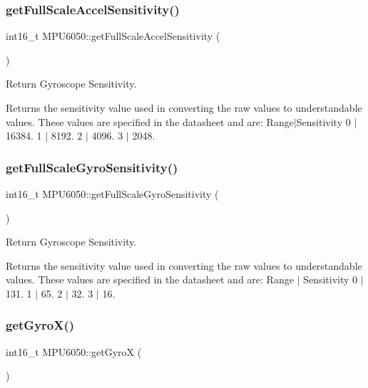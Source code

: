 \subsubsection{\texorpdfstring{get\+Full\+Scale\+Accel\+Sensitivity()}{getFullScaleAccelSensitivity()}}
{\footnotesize\ttfamily int16\+\_\+t M\+P\+U6050\+::get\+Full\+Scale\+Accel\+Sensitivity (\begin{DoxyParamCaption}{ }\end{DoxyParamCaption})}



Return Gyroscope Sensitivity. 

Returns the sensitivity value used in converting the raw values to understandable values. These values are specified in the datasheet and are\+: Range$\vert$\+Sensitivity 0 $\vert$ 16384. 1 $\vert$ 8192. 2 $\vert$ 4096. 3 $\vert$ 2048. \mbox{\label{class_m_p_u6050_af5bb476a5c5960a234ce87ff6cfbc495}} 
\subsubsection{\texorpdfstring{get\+Full\+Scale\+Gyro\+Sensitivity()}{getFullScaleGyroSensitivity()}}
{\footnotesize\ttfamily int16\+\_\+t M\+P\+U6050\+::get\+Full\+Scale\+Gyro\+Sensitivity (\begin{DoxyParamCaption}{ }\end{DoxyParamCaption})}



Return Gyroscope Sensitivity. 

Returns the sensitivity value used in converting the raw values to understandable values. These values are specified in the datasheet and are\+: Range $\vert$ Sensitivity 0 $\vert$ 131. 1 $\vert$ 65. 2 $\vert$ 32. 3 $\vert$ 16. \mbox{\label{class_m_p_u6050_a6da3ae068a2bc895eb24e19c073eef97}} 
\subsubsection{\texorpdfstring{get\+Gyro\+X()}{getGyroX()}}
{\footnotesize\ttfamily int16\+\_\+t M\+P\+U6050\+::get\+GyroX (\begin{DoxyParamCaption}{ }\end{DoxyParamCaption})}



